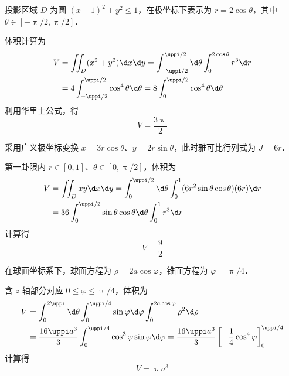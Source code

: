 \begin{solution}
     投影区域 $D$ 为圆 $(x-1)^2 + y^2 \le 1$，在极坐标下表示为 $r = 2\cos \theta$，其中 $\theta \in [-\uppi/2, \uppi/2]$．

    体积计算为
    \begin{equation}
        \begin{aligned}
            V & = \iint_D (x^2 + y^2) \d x \d y = \int_{-\uppi/2}^{\uppi/2} \d \theta \int_0^{2\cos \theta} r^3 \d r \\
              & = 4 \int_{-\uppi/2}^{\uppi/2} \cos^4 \theta \d \theta = 8 \int_0^{\uppi/2} \cos^4 \theta \d \theta
        \end{aligned}
    \end{equation}
    利用华里士公式，得
    \begin{equation}
        V = \boxed{\frac{3\uppi}{2}}
    \end{equation}

     采用广义极坐标变换 $x = 3r \cos \theta$、$y = 2r \sin \theta$，此时雅可比行列式为 $J = 6r$．

    第一卦限内 $r \in [0, 1]$、$\theta \in [0, \uppi/2]$，体积为
    \begin{equation}
        \begin{aligned}
            V & = \iint_D xy \d x \d y = \int_0^{\uppi/2} \d \theta \int_0^1 (6 r^2 \sin \theta \cos \theta) (6r) \d r \\
              & = 36 \int_0^{\uppi/2} \sin \theta \cos \theta \d \theta \int_0^1 r^3 \d r
        \end{aligned}
    \end{equation}
    计算得
    \begin{equation}
        V = \boxed{\frac{9}{2}}
    \end{equation}

     在球面坐标系下，球面方程为 $\rho = 2a \cos \varphi$，锥面方程为 $\varphi = \uppi/4$．

    含 $z$ 轴部分对应 $0 \le \varphi \le \uppi/4$，体积为
    \begin{equation}
        \begin{aligned}
            V & = \int_0^{2\uppi} \d \theta \int_0^{\uppi/4} \sin \varphi \d \varphi \int_0^{2a \cos \varphi} \rho^2 \d \rho                                                   \\
              & = \frac{16\uppi a^3}{3} \int_0^{\uppi/4} \cos^3 \varphi \sin \varphi \d \varphi = \frac{16\uppi a^3}{3} \left[ -\frac{1}{4} \cos^4 \varphi \right]_0^{\uppi/4}
        \end{aligned}
    \end{equation}
    计算得
    \begin{equation}
        V = \boxed{\uppi a^3}
    \end{equation}


\end{solution}
